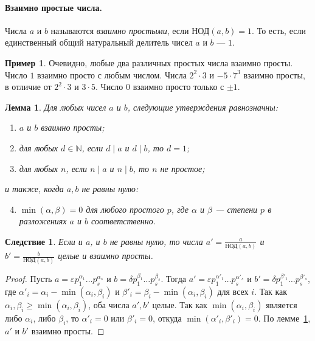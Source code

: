 \documentclass[12pt,notitlepage]{article}
\theoremstyle{plain}
\newtheorem{lemma}[thm]{Лемма}
\newtheorem{corr}[thm]{Следствие}
\theoremstyle{definition}
\newtheorem{exm}[thm]{Пример}
\theoremstyle{plain}
\newcommand{\N}{\mathbb{N}}
\newcommand{\eps}{\varepsilon}
\newcommand{\1}{\mathbf{1}}
\newcommand{\0}{\mathbf{0}}
\newcommand{\dvd}{\mathop{\mid}}
\begin{document}
\paragraph{Взаимно простые числа.} Числа $a$ и $b$ называются \emph{взаимно простыми}, если $\text{НОД}(a, b) = 1$. То есть, если единственный общий натуральный делитель чисел $a$ и $b$ --- $1$.
\begin{exm}
	Очевидно, любые два различных простых числа взаимно просты. Число $1$ взаимно просто с любым числом. Числа $2^2 \cdot 3$ и $- 5 \cdot 7^3$ взаимно просты, в отличие от $2^2 \cdot 3$ и $3 \cdot 5$. Число $0$ взаимно просто только с $\pm 1$.
\end{exm}

\begin{lemma}\label{L5:coprime}
	Для любых чисел $a$ и $b$, следующие утверждения равнозначны:
	\begin{enumerate}
		\item $a$ и $b$ взаимно просты;
		\item для любых $d \in \N$, если $d \dvd a$ и $d \dvd b$, то $d = 1$;
		\item для любых $n$, если $n \dvd a$ и $n \dvd b$, то $n$ не простое;
	\end{enumerate}
	и также, когда $a, b$ не равны нулю:
	\begin{enumerate}
		\setcounter{enumi}{3}
		\item $\min(\alpha, \beta) = 0$ для любого простого $p$, где $\alpha$ и $\beta$ --- степени $p$ в разложениях $a$ и $b$ соответственно.
	\end{enumerate}
\end{lemma}

\begin{corr}
	Если и $a$, и $b$ не равны нулю, то числа $a' = \frac{a}{\text{НОД}(a, b)}$ и $b' = \frac{b}{\text{НОД}(a, b)}$ целые и взаимно просты.
\end{corr}
\begin{proof}
	Пусть $a = \eps p^{\alpha_1}_1\ldots p^{\alpha_s}_s$ и $b = \delta p^{\beta_1}_1\ldots p^{\beta_s}_s$. Тогда $a' = \eps p^{\alpha'_1}_1\ldots p^{\alpha'_s}_s$ и $b' = \delta p^{\beta'_1}_1\ldots p^{\beta'_s}_s$, где $\alpha'_i = \alpha_i - \min(\alpha_i, \beta_i)$ и $\beta'_i = \beta_i - \min(\alpha_i, \beta_i)$ для всех $i$. Так как $\alpha_i, \beta_i \geq \min(\alpha_i, \beta_i)$, оба числа $a', b'$ целые. Так как $\min(\alpha_i, \beta_i)$ является либо $\alpha_i$, либо $\beta_i$, то $\alpha'_i = 0$ или $\beta'_i = 0$, откуда $\min(\alpha'_i, \beta'_i) = 0$. По лемме~\ref{L5:coprime}, $a'$ и $b'$ взаимно просты.
\end{proof}
\end{document}
